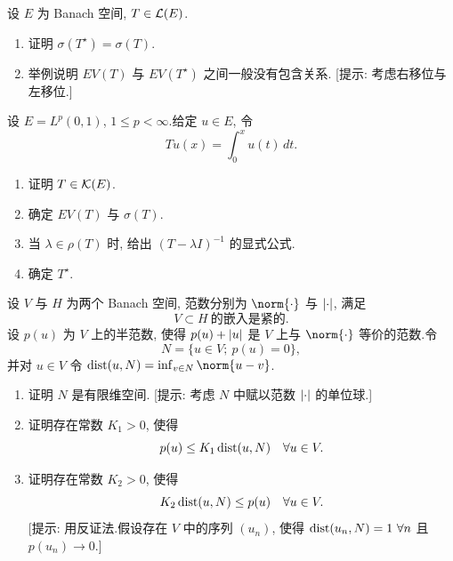 \begin{exercise}
\label{exer:6.19}
设 $E$ 为 Banach 空间, $T\in\mathcal{L}(E)$.
\begin{enumerate}[label=\arabic*., leftmargin=2.2em, itemsep=0.3em]
	\item 证明 $\sigma(T^\star)=\sigma(T)$.
	\item 举例说明 $EV(T)$ 与 $EV(T^\star)$ 之间一般没有包含关系.
	      [提示: 考虑右移位与左移位.]
\end{enumerate}
\end{exercise}

\begin{exercise}
\label{exer:6.20}
设 $E=L^p(0,1)$, $1\le p<\infty$.给定 $u\in E$, 令
\begin{equation*}
Tu(x)=\int_0^xu(t)\,dt.
\end{equation*}
\begin{enumerate}[label=\arabic*., leftmargin=2.2em, itemsep=0.3em]
	\item 证明 $T\in\mathcal{K}(E)$.
	\item 确定 $EV(T)$ 与 $\sigma(T)$.
	\item 当 $\lambda\in\rho(T)$ 时, 给出 $(T-\lambda I)^{-1}$ 的显式公式.
	\item 确定 $T^\star$.
\end{enumerate}
\end{exercise}

\begin{exercise}
\label{exer:6.21}
设 $V$ 与 $H$ 为两个 Banach 空间, 范数分别为 $\norm{\cdot}$ 与
$\left|\cdot\right|$, 满足
\begin{equation*}
V\subset H\ \text{的嵌入是紧的}.
\end{equation*}
设 $p(u)$ 为 $V$ 上的半范数, 使得 $p(u)+\left|u\right|$ 是 $V$ 上与
$\norm{\cdot}$ 等价的范数.令
\begin{equation*}
N=\{u\in V;\ p(u)=0\},
\end{equation*}
并对 $u\in V$ 令 $\dist(u,N)=\inf_{v\in N}\norm{u-v}$.
\begin{enumerate}[label=\arabic*., leftmargin=2.2em, itemsep=0.3em]
	\item 证明 $N$ 是有限维空间.
	      [提示: 考虑 $N$ 中赋以范数 $\left|\cdot\right|$ 的单位球.]
	\item 证明存在常数 $K_1>0$, 使得
	      \begin{equation*}
	      p(u)\le K_1\operatorname{dist}(u,N)\quad\forall u\in V.
	      \end{equation*}
	\item 证明存在常数 $K_2>0$, 使得
	      \begin{equation*}
	      K_2\operatorname{dist}(u,N)\le p(u)\quad\forall u\in V.
	      \end{equation*}
	      [提示: 用反证法.假设存在 $V$ 中的序列 $(u_n)$, 使得
	      $\operatorname{dist}(u_n,N)=1\ \forall n$ 且 $p(u_n)\to0$.]
\end{enumerate}
\end{exercise}

